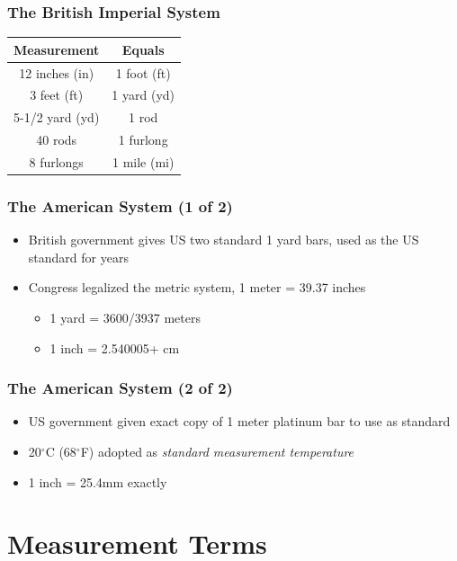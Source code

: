 \begin{frame}
	\frametitle{The British Imperial System}
    \begin{table}
        \centering
        \begin{tabular}{cc}
            \hline
            Measurement & Equals\\
            \hline
            12 inches (in) & 1 foot (ft)\\
            3 feet (ft) & 1 yard (yd)\\
            5-1/2 yard (yd) & 1 rod\\
            40 rods & 1 furlong\\
            8 furlongs & 1 mile (mi)\\
            \hline
        \end{tabular}
    \end{table}
\end{frame}

\begin{frame}
	\frametitle{The American System (1 of 2)}
    \begin{itemize}[<+- | alert@+>]
        \item[1856] British government gives US two standard 1 yard bars, used as the US standard for years
        \item[1866] Congress legalized the metric system, 1 meter = 39.37 inches
        \begin{itemize}
            \item 1 yard = 3600/3937 meters
            \item 1 inch = 2.540005+ cm
        \end{itemize}
    \end{itemize}
\end{frame}

\begin{frame}
	\frametitle{The American System (2 of 2)}
    \begin{itemize}[<+- | alert@+>]
        \item[1889] US government given exact copy of 1 meter platinum bar to use as standard
        \item[1932] 20$^{\circ}$C (68$^{\circ}$F) adopted as \emph{standard measurement temperature}
        \item[1959] 1 inch = 25.4mm exactly
    \end{itemize}
\end{frame}

\section{Measurement Terms}

